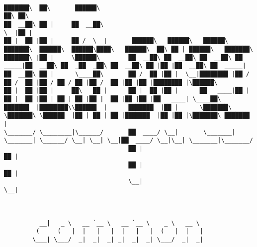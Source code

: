 \documentclass[varwidth=\maxdimen,margin=0.5cm,multi={verbatim}]{standalone}
\begin{document}
\begin{verbatim}

███████\  ██\       ██████\                                                                                  ██\ ██\
██  __██\ ██ |     ██  __██\                                                                                 \__|██ |
██ |  ██ |██ |     ██ /  \__|       ██████\   ██████\   ██████\   ███████\  ██████\  ██████\████\   ██████\  ██\ ██ | ██████\   ███████\
███████\ |██ |     \██████\        ██  __██\ ██  __██\ ██  __██\ ██  _____|██  __██\ ██  _██  _██\ ██  __██\ ██ |██ |██  __██\ ██  _____|
██  __██\ ██ |      \____██\       ██ /  ██ |██ |  \__|████████ |██ /      ██ /  ██ |██ / ██ / ██ |██ /  ██ |██ |██ |████████ |\██████\
██ |  ██ |██ |     ██\   ██ |      ██ |  ██ |██ |      ██   ____|██ |      ██ |  ██ |██ | ██ | ██ |██ |  ██ |██ |██ |██   ____| \____██\
███████  |████████\\██████  |      ███████  |██ |      \███████\ \███████\ \██████  |██ | ██ | ██ |███████  |██ |██ |\███████\ ███████  |
\_______/ \________|\______/       ██  ____/ \__|       \_______| \_______| \______/ \__| \__| \__|██  ____/ \__|\__| \_______|\_______/
                                   ██ |                                                            ██ |
                                   ██ |                                                            ██ |
                                   \__|                                                            \__|



          __|   _ \   __ `__ \   __ `__ \    _ \   __ \
         (     (   |  |   |   |  |   |   |  (   |  |   |
        \___| \___/  _|  _|  _| _|  _|  _| \___/  _|  _|



\end{verbatim}
\end{document}

